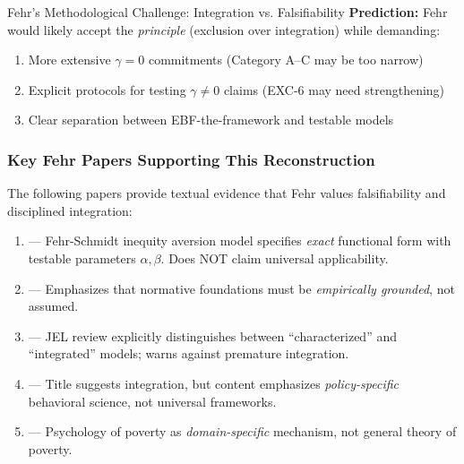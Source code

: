 \begin{chapter}{Fehr's Methodological Challenge: Integration vs. Falsifiability}
\textbf{Prediction:} Fehr would likely accept the \textit{principle} (exclusion over integration) while demanding:
\begin{enumerate}[noitemsep]
    \item More extensive $\gamma = 0$ commitments (Category A--C may be too narrow)
    \item Explicit protocols for testing $\gamma \neq 0$ claims (EXC-6 may need strengthening)
    \item Clear separation between EBF-the-framework and testable models
\end{enumerate}

\subsubsection{Key Fehr Papers Supporting This Reconstruction}

The following papers provide textual evidence that Fehr values falsifiability and disciplined integration:

\begin{tcolorbox}[colback=blue!5!white,colframe=blue!75!black,title=\textbf{Primary Sources for Fehr's Methodological Position}]
\begin{enumerate}[noitemsep]
    \item \textbf{\citet{fehr1999theory}} --- Fehr-Schmidt inequity aversion model specifies \textit{exact} functional form with testable parameters $\alpha, \beta$. Does NOT claim universal applicability.

    \item \textbf{\citet{fehr2022normative}} --- Emphasizes that normative foundations must be \textit{empirically grounded}, not assumed.

    \item \textbf{\citet{fehr2024social}} --- JEL review explicitly distinguishes between ``characterized'' and ``integrated'' models; warns against premature integration.

    \item \textbf{\citet{fehr2015integrated}} --- Title suggests integration, but content emphasizes \textit{policy-specific} behavioral science, not universal frameworks.

    \item \textbf{\citet{haushofer2014psychology}} --- Psychology of poverty as \textit{domain-specific} mechanism, not general theory of poverty.
\end{enumerate}
\end{tcolorbox}


\end{chapter}
